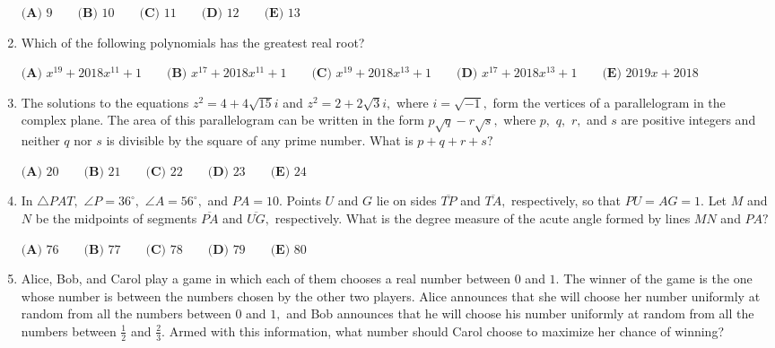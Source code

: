 \documentclass{article}
\begin{document}
\begin{enumerate}[label=\arabic*., itemsep=0.5em]
$
\textbf{(A) }9 \qquad
\textbf{(B) }10 \qquad
\textbf{(C) }11 \qquad
\textbf{(D) }12 \qquad
\textbf{(E) }13 \qquad
$\par \vspace{0.5em}\item Which of the following polynomials has the greatest real root?

$\textbf{(A) }   x^{19}+2018x^{11}+1   \qquad        \textbf{(B) }   x^{17}+2018x^{11}+1   \qquad    \textbf{(C) }   x^{19}+2018x^{13}+1   \qquad   \textbf{(D) }  x^{17}+2018x^{13}+1 \qquad  \textbf{(E) }   2019x+2018 $\par \vspace{0.5em}\item The solutions to the equations $z^2=4+4\sqrt{15}i$ and $z^2=2+2\sqrt 3i,$ where $i=\sqrt{-1},$ form the vertices of a parallelogram in the complex plane. The area of this parallelogram can be written in the form $p\sqrt q-r\sqrt s,$ where $p,$ $q,$ $r,$ and $s$ are positive integers and neither $q$ nor $s$ is divisible by the square of any prime number. What is $p+q+r+s?$

$\textbf{(A) } 20 \qquad 
\textbf{(B) } 21 \qquad 
\textbf{(C) } 22 \qquad 
\textbf{(D) } 23 \qquad 
\textbf{(E) } 24 $\par \vspace{0.5em}\item In $\triangle PAT,$ $\angle P=36^{\circ},$ $\angle A=56^{\circ},$ and $PA=10.$ Points $U$ and $G$ lie on sides $\overline{TP}$ and $\overline{TA},$ respectively, so that $PU=AG=1.$ Let $M$ and $N$ be the midpoints of segments $\overline{PA}$ and $\overline{UG},$ respectively. What is the degree measure of the acute angle formed by lines $MN$ and $PA?$

$\textbf{(A) } 76 \qquad 
\textbf{(B) } 77 \qquad 
\textbf{(C) } 78 \qquad 
\textbf{(D) } 79 \qquad 
\textbf{(E) } 80 $\par \vspace{0.5em}\item Alice, Bob, and Carol play a game in which each of them chooses a real number between $0$ and $1.$ The winner of the game is the one whose number is between the numbers chosen by the other two players. Alice announces that she will choose her number uniformly at random from all the numbers between $0$ and $1,$ and Bob announces that he will choose his number uniformly at random from all the numbers between $\tfrac{1}{2}$ and $\tfrac{2}{3}.$ Armed with this information, what number should Carol choose to maximize her chance of winning?


\end{enumerate}
\end{document}
